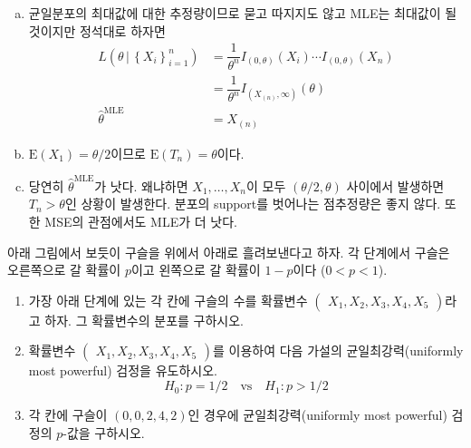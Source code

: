 \documentclass[answers]{exam}
\begin{document}
\begin{questions}
\begin{enumerate}[(a)]
   \end{enumerate}
   \begin{solution}
    \begin{enumerate}[(a)]
      \item 균일분포의 최대값에 대한 추정량이므로 묻고 따지지도 않고 MLE는 최대값이 될 것이지만 정석대로 하자면
      \begin{align}
        L\left(\theta\,|\,\left\{X_{i}\right\}_{i=1}^{n}\right) &= \dfrac{1}{\theta^{n}}I_{\left(0,\theta\right)}\left(X_{i}\right)\cdots I_{\left(0,\theta\right)}\left(X_{n}\right)\\
        &=\dfrac{1}{\theta^{n}}I_{\left(X_{\left(n\right)},\infty\right)}\left(\theta\right)\\
        \widehat{\theta}^{\text{MLE}} &= X_{\left(n\right)}
      \end{align}
      \item $\mathrm{E}\left(X_{1}\right)=\theta/2$이므로 $\mathrm{E}\left(T_{n}\right)=\theta$이다.
      \item 당연히 $\widehat{\theta}^{\text{MLE}}$가 낫다. 왜냐하면 $X_{1},\ldots,X_{n}$이 모두 $\left(\theta/2,\theta\right)$ 사이에서 발생하면 $T_{n}>\theta$인 상황이 발생한다. 분포의 support를 벗어나는 점추정량은 좋지 않다. 또한 MSE의 관점에서도 MLE가 더 낫다.
    \end{enumerate}
   \end{solution}
   \question
   아래 그림에서 보듯이 구슬을 위에서 아래로 흘려보낸다고 하자. 각 단계에서 구슬은 오른쪽으로 갈 확률이 $p$이고 왼쪽으로 갈 확률이 $1-p$이다 ($0<p<1$).
   \begin{enumerate}[(1)]
    \item 가장 아래 단계에 있는 각 칸에 구슬의 수를 확률변수 $\begin{pmatrix}X_{1},X_{2},X_{3},X_{4},X_{5}\end{pmatrix}$라고 하자. 그 확률변수의 분포를 구하시오.
    \item 확률변수 $\begin{pmatrix}X_{1},X_{2},X_{3},X_{4},X_{5}\end{pmatrix}$를 이용하여 다음 가설의 균일최강력(uniformly most powerful) 검정을 유도하시오.
    \begin{equation}
      H_{0}: p=1/2\quad \text{vs}\quad H_{1}:p>1/2
    \end{equation}
    \item 각 칸에 구슬이 $(0,0,2,4,2)$인 경우에 균일최강력(uniformly most powerful) 검정의 $p$-값을 구하시오.
   \end{enumerate}

\end{questions}
\end{document}
